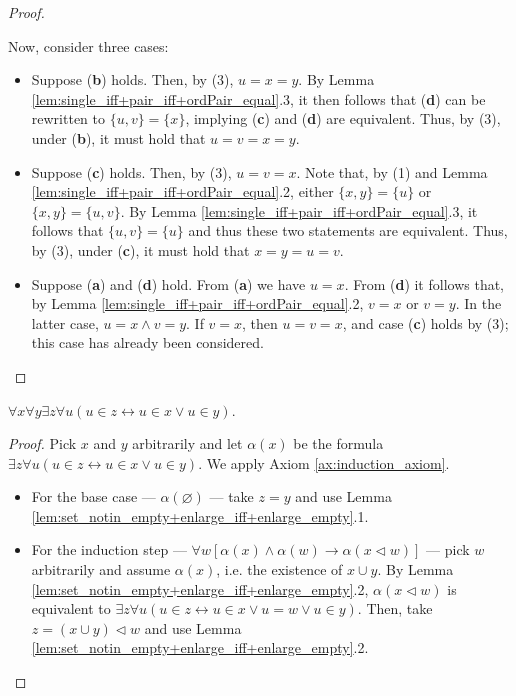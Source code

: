 \begin{proof}
\begin{enumerate}
        Now, consider three cases:
        \begin{itemize}
            \item Suppose (\textbf{b}) holds. Then, by (3), $u=x=y$. By Lemma \ref{lem:single_iff+pair_iff+ordPair_equal}.3, it then follows that 
            (\textbf{d}) can be rewritten to $\{u,v\}=\{x\}$, implying (\textbf{c}) and (\textbf{d}) are equivalent.
            Thus, by (3), under (\textbf{b}), it must hold that $u=v=x=y$.
            \item Suppose (\textbf{c}) holds. Then, by (3), $u=v=x$. Note that, by (1) and Lemma \ref{lem:single_iff+pair_iff+ordPair_equal}.2, 
            either $\{x,y\}=\{u\}$ or $\{x,y\}=\{u,v\}$.  By Lemma \ref{lem:single_iff+pair_iff+ordPair_equal}.3, it follows that $\{u,v\}=\{u\}$ and 
            thus these two statements are equivalent. Thus, by (3), under (\textbf{c}), it must hold that $x=y=u=v$.
            \item Suppose (\textbf{a}) and (\textbf{d}) hold. From (\textbf{a}) we have $u=x$. 
            From (\textbf{d}) it follows that, by Lemma \ref{lem:single_iff+pair_iff+ordPair_equal}.2, $v=x$ or $v=y$. In the latter case, 
            $u=x\land v=y$. If $v=x$, then $u=v=x$, and case (\textbf{c}) holds by (3); this case has already been considered.
        \end{itemize}
    \end{enumerate}
\end{proof}

\begin{theorem}
    \label{thm:exists_union}
    \leanok
    $\forall x \forall y \exists z \forall u (u \in z \leftrightarrow u \in x \lor u \in y)$.
\end{theorem}

\begin{proof}
    \leanok
    Pick $x$ and $y$ arbitrarily and let $\alpha (x)$ be the formula $\exists z \forall u (u \in z \leftrightarrow u \in x \lor u \in y)$.
    We apply Axiom \ref{ax:induction_axiom}.
    \begin{itemize}
        \item For the base case — $\alpha (\varnothing)$ — take $z=y$ and use Lemma \ref{lem:set_notin_empty+enlarge_iff+enlarge_empty}.1.
        \item For the induction step — $\forall w[\alpha(x) \land \alpha(w) \rightarrow \alpha(x \lhd w)]$ — 
        pick $w$ arbitrarily and assume $\alpha(x)$, i.e. the existence of $x \cup y$. By Lemma \ref{lem:set_notin_empty+enlarge_iff+enlarge_empty}.2, 
        $\alpha(x \lhd w)$ is equivalent to $\exists z \forall u (u \in z \leftrightarrow u \in x \lor u = w \lor u \in y)$.
        Then, take $z= (x \cup y) \lhd w$ and use Lemma \ref{lem:set_notin_empty+enlarge_iff+enlarge_empty}.2.
    \end{itemize}
\end{proof}

